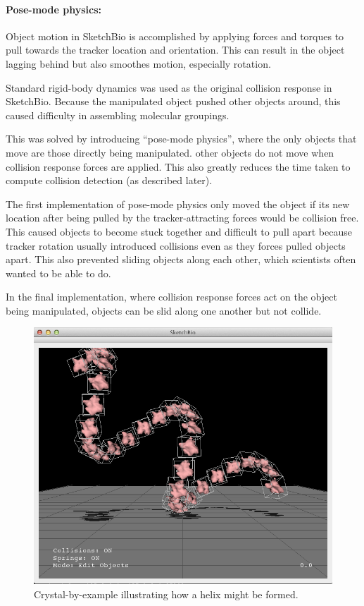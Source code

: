 \documentclass[twocolumn]{bmcart}%
\begin{document}
\paragraph*{Pose-mode physics:}
Object motion in SketchBio is accomplished by applying forces and torques to pull towards the tracker location and orientation.
This can result in the object lagging behind but also smoothes motion, especially rotation.

Standard rigid-body dynamics was used as the original collision response in SketchBio. Because the manipulated object pushed other objects around, this caused difficulty in assembling molecular groupings.

This was solved by introducing ``pose-mode physics'', where the only objects that move are those directly being manipulated.
other objects do not move when collision response forces are applied.
This also greatly reduces the time taken to compute collision detection (as described later).

The first implementation of pose-mode physics only moved the object if its new location after being pulled by the tracker-attracting forces would be collision free.
This caused objects to become stuck together and difficult to pull apart because tracker rotation usually introduced collisions even as they forces pulled objects apart.
This also prevented sliding objects along each other, which scientists often wanted to be able to do.

In the final implementation, where collision response forces act on the object being manipulated, objects can be slid along one another but not collide.

\begin{figure}[h]
\centering
\includegraphics[width=0.9\columnwidth]{crystalByExample.png}
\caption{Crystal-by-example illustrating how a helix might be formed.}
\label{fig:crystal_by_example}
\end{figure}
\end{document}
